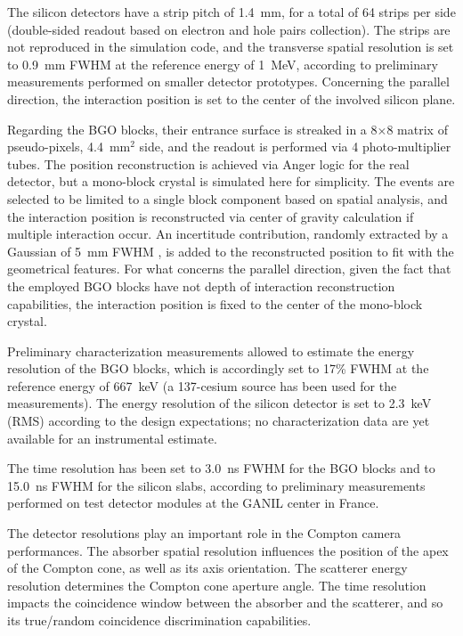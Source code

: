 The silicon detectors have a strip pitch of 1.4~mm, for a total of 64 strips per side (double-sided readout based on electron and hole pairs collection). The strips are not reproduced in the simulation code, and the transverse spatial resolution is set to 0.9~mm FWHM at the reference energy of 1~MeV, according to preliminary measurements performed on smaller detector prototypes. Concerning the parallel direction, the interaction position is set to the center of the involved silicon plane.

Regarding the BGO blocks, their entrance surface is streaked in a 8$\times$8 matrix of pseudo-pixels, 4.4~mm$^{2}$ side, and the readout is performed via 4 photo-multiplier tubes. The position reconstruction is achieved via Anger logic for the real detector, but a mono-block crystal is simulated here for simplicity. The events are selected to be limited to a single block component based on spatial analysis, and the interaction position is reconstructed via center of gravity calculation if multiple interaction occur. An incertitude contribution, randomly extracted by a Gaussian of 5~mm FWHM , is added to the reconstructed position to fit with the geometrical features. For what concerns the parallel direction, given the fact that the employed BGO blocks have not depth of interaction reconstruction capabilities, the interaction position is fixed to the center of the mono-block crystal.

Preliminary characterization measurements allowed to estimate the energy resolution of the BGO blocks, which is accordingly set to 17\% FWHM at the reference energy of 667~keV (a 137-cesium source has been used for the measurements). The energy resolution of the silicon detector is set to 2.3~keV (RMS) according to the design expectations; no characterization data are yet available for an instrumental estimate.

The time resolution has been set to 3.0~ns FWHM for the BGO blocks and to 15.0~ns FWHM for the silicon slabs, according to preliminary measurements performed on test detector modules at the GANIL %
center in France.

The detector resolutions play an important role in the Compton camera performances. The absorber spatial resolution influences the position of the apex of the Compton cone, as well as its axis orientation. The scatterer energy resolution determines the Compton cone aperture angle. The time resolution impacts the coincidence window between the absorber and the scatterer, and so its true/random coincidence discrimination capabilities.

